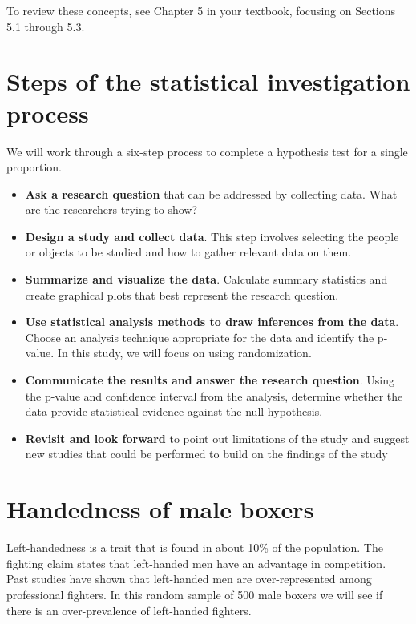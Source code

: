 \documentclass[
]{report}
\begin{document}
To review these concepts, see Chapter 5 in your textbook, focusing on Sections 5.1 through 5.3.

\hypertarget{steps-of-the-statistical-investigation-process}{%
\section{Steps of the statistical investigation process}\label{steps-of-the-statistical-investigation-process}}

We will work through a six-step process to complete a hypothesis test for a single proportion.

\begin{itemize}
\item
  \textbf{Ask a research question} that can be addressed by collecting data. What are the researchers trying to show?
\item
  \textbf{Design a study and collect data}. This step involves selecting the people or objects to be studied and how to gather relevant data on them.
\item
  \textbf{Summarize and visualize the data}. Calculate summary statistics and create graphical plots that best represent the research question.
\item
  \textbf{Use statistical analysis methods to draw inferences from the data}. Choose an analysis technique appropriate for the data and identify the p-value. In this study, we will focus on using randomization.
\item
  \textbf{Communicate the results and answer the research question}. Using the p-value and confidence interval from the analysis, determine whether the data provide statistical evidence against the null hypothesis.
\item
  \textbf{Revisit and look forward} to point out limitations of the study and suggest new studies that could be performed to build on the findings of the study
\end{itemize}

\hypertarget{handedness-of-male-boxers-1}{%
\section{Handedness of male boxers}\label{handedness-of-male-boxers-1}}

Left-handedness is a trait that is found in about 10\% of the population. The fighting claim states that left-handed men have an advantage in competition. Past studies have shown that left-handed men are over-represented among professional fighters. In this random sample of 500 male boxers we will see if there is an over-prevalence of left-handed fighters.
\end{document}
